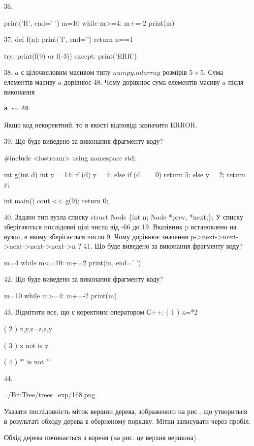 \documentclass[11pt]{article}
\begin{document}
36. 

print('R', end=' ')
m=10
while m>=4:
    m+=-2
print(m)


37. 
def f(n):
    print('f', end='')
    return n==1

try:
    print(f(9) or f(-3))
except:
    print('ERR')

38. 
$a$ є цілочисловим масивом типу $numpy.ndarray$ розмірів $5{\times}5$. Сума елементів масиву $a$ дорівнює 48. Чому дорівнює сума елементів масиву $a$ після виконання 
\begin{verbatim}
a -= 48
\end{verbatim}


Якщо код некоректний, то в якості відповіді зазначити ERROR.



39. Що буде виведено за виконання фрагменту коду?

#include <iostream>
using namespace std;

int g(int d){
    int y = 14;
    if (d) 
        y = 4;
    else if (d == 0)
         return 5;
    else
         y = 2;
    return y;
}

int main(){
    cout << g(9);
    return 0;
}


40. 
Задано тип вузла списку
struct Node \{int n; Node *prev, *next;\};
У списку зберігаються послідовні цілі числа від -66 до 19. Вказівник p встановлено на вузол, в якому зберігається число 9.
Чому дорівнює значення p->next->next->next->next->next->n ?
41. Що буде виведено за виконання фрагменту коду?

m=4
while m<=10:
    m+=2
print(m, end=' ')


42. Що буде виведено за виконання фрагменту коду?

m=10
while m>=4:
    m+=-2
print(m)


43. %
Відмітити все, що є коректним оператором С++:
( 1 ) x=*2

( 2 ) x,y,z=z,z,y

( 3 ) x not is y

( 4 ) "\n" is not '\n'

44. 

\begin{center}
	{../BinTree/trees_exp/168.png}
\end{center}
Указати послідовність міток вершин дерева, зображеного на рис., що утвориться в результаті обходу дерева в оберненому порядку. Мітки записувати через пробіл.\par Обхід дерева починається з кореня (на рис. це верхня вершина).
\end{document}
